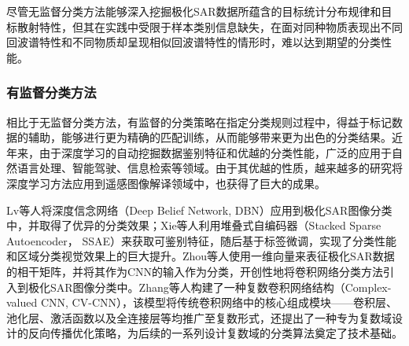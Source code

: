 
尽管无监督分类方法能够深入挖掘极化SAR数据所蕴含的目标统计分布规律和目标散射特性，但其在实践中受限于样本类别信息缺失，在面对同种物质表现出不同回波谱特性和不同物质却呈现相似回波谱特性的情形时，难以达到期望的分类性能。

\subsubsection{有监督分类方法}
相比于无监督分类方法，有监督的分类策略在指定分类规则过程中，得益于标记数据的辅助，能够进行更为精确的匹配训练，从而能够带来更为出色的分类结果。近年来，由于深度学习的自动挖掘数据鉴别特征和优越的分类性能，广泛的应用于自然语言处理、智能驾驶、信息检索等领域。由于其优越的性质，越来越多的研究将深度学习方法应用到遥感图像解译领域中，也获得了巨大的成果。



Lv等人将深度信念网络（Deep Belief Network, DBN）应用到极化SAR图像分类中，并取得了优异的分类效果；Xie等人利用堆叠式自编码器（Stacked Sparse Autoencoder， SSAE）来获取可鉴别特征，随后基于标签微调，实现了分类性能和区域分类视觉效果上的巨大提升。Zhou等人使用一维向量来表征极化SAR数据的相干矩阵，并将其作为CNN的输入作为分类，开创性地将卷积网络分类方法引入到极化SAR图像分类中。Zhang等人构建了一种复数卷积网络结构（Complex-valued CNN, CV-CNN），该模型将传统卷积网络中的核心组成模块——卷积层、池化层、激活函数以及全连接层等均推广至复数形式，还提出了一种专为复数域设计的反向传播优化策略，为后续的一系列设计复数域的分类算法奠定了技术基础。



